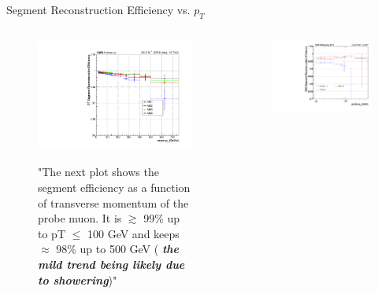 \documentclass[10pt]{beamer}
\begin{document}
\begin{frame}[fragile]{Segment Reconstruction Efficiency vs. $p_{T}$}
\begin{columns}

\begin{column}{0.5\textwidth}
    \begin{figure}
        \centering
        \href{https://twiki.cern.ch/twiki/bin/view/CMSPublic/DtDPGResults18042019#DT_Segment_Efficiency_maps}{\includegraphics[width=\textwidth]{figures/ShoweringEffect/DT_eff_vs_pt.pdf}}
        \caption{{\scriptsize "The next plot shows the segment efficiency as a function of transverse momentum of the probe muon. It is $\gtrsim$ 99\% up to pT $\le$ 100 GeV and keeps $\approx$ 98\% up to 500 GeV ({\color{uosblue} \textbf{\textit{the mild trend being likely due to showering}}})"}}
    \end{figure}
\end{column}
\begin{column}{0.5\textwidth}
    \begin{figure}
        \centering
        \href{https://twiki.cern.ch/twiki/bin/view/CMSPublic/MuonDPGPublic160729#CSC_Segment_Efficiency}{\includegraphics[width=\textwidth]{figures/ShoweringEffect/CSC_seg_eff_JSON_June22all_pt_St_ME1.pdf}}

\end{figure}
\end{column}
\end{columns}
\end{frame}
\end{document}
